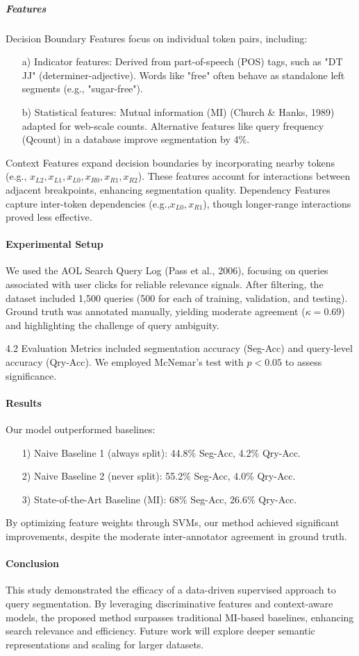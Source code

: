 \subparagraph*{\textbf{Features}}
Decision Boundary Features focus on individual token pairs, including:
\begin{enumerate}
\item[a)] Indicator features: Derived from part-of-speech (POS) tags, such as "DT JJ" (determiner-adjective). Words like "free" often behave as standalone left segments (e.g., "sugar-free").
\item[b)] Statistical features: Mutual information (MI) (Church \& Hanks, 1989) adapted for web-scale counts. Alternative features like query frequency (Qcount) in a database improve segmentation by 4\%.
\end{enumerate}
Context Features expand decision boundaries by incorporating nearby tokens (e.g., $x_{L2}, x_{L1}, x_{L0}, x_{R0}, x_{R1}, x_{R2}$). These features account for interactions between adjacent breakpoints, enhancing segmentation quality.
Dependency Features capture inter-token dependencies (e.g.,$x_{L0},x_{R1}$), though longer-range interactions proved less effective.

\paragraph*{Experimental Setup}
We used the AOL Search Query Log (Pass et al., 2006), focusing on queries associated with user clicks for reliable relevance signals. After filtering, the dataset included 1,500 queries (500 for each of training, validation, and testing). Ground truth was annotated manually, yielding moderate agreement ($\kappa=0.69$) and highlighting the challenge of query ambiguity.

4.2 Evaluation
Metrics included segmentation accuracy (Seg-Acc) and query-level accuracy (Qry-Acc). We employed McNemar's test with $p<0.05$ to assess significance.

\paragraph*{Results}
Our model outperformed baselines:
\begin{enumerate}
\item[1)] Naive Baseline 1 (always split): 44.8\% Seg-Acc, 4.2\% Qry-Acc.
\item[2)] Naive Baseline 2 (never split): 55.2\% Seg-Acc, 4.0\% Qry-Acc.
\item[3)] State-of-the-Art Baseline (MI): 68\% Seg-Acc, 26.6\% Qry-Acc.
\end{enumerate}
By optimizing feature weights through SVMs, our method achieved significant improvements, despite the moderate inter-annotator agreement in ground truth.

\paragraph*{Conclusion}
This study demonstrated the efficacy of a data-driven supervised approach to query segmentation. By leveraging discriminative features and context-aware models, the proposed method surpasses traditional MI-based baselines, enhancing search relevance and efficiency. Future work will explore deeper semantic representations and scaling for larger datasets.